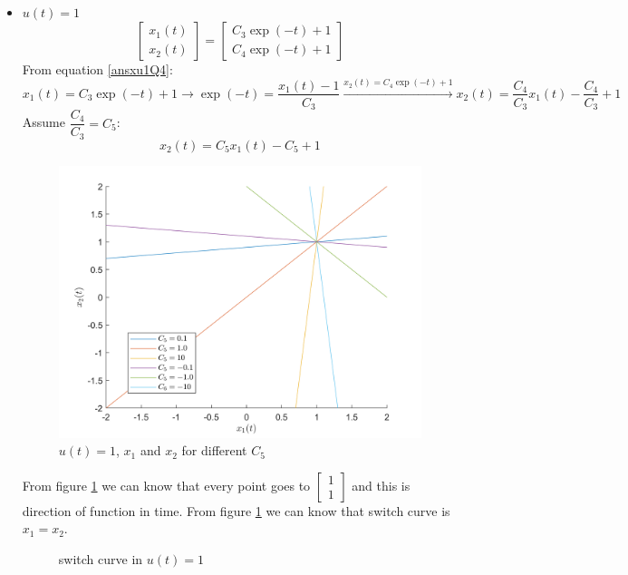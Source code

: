 \begin{itemize}
	\item $u(t) = 1$
	\begin{equation}\label{ansxu1Q4}
		\begin{bmatrix}
			x_1(t) \\
			x_2(t)
		\end{bmatrix}
		= 
		\begin{bmatrix}
			C_3\exp(-t) + 1 \\
			C_4\exp(-t) + 1
		\end{bmatrix}
	\end{equation}
From equation \ref{ansxu1Q4}:
$$x_1(t) = C_3\exp(-t) + 1 \to \exp(-t) = \dfrac{x_1(t)-1}{C_3}\xrightarrow{x_2(t)=C_4\exp(-t) + 1} x_2(t) = \dfrac{C_4}{C_3}x_1(t) -‌\dfrac{C_4}{C_3} +1$$
Assume $\dfrac{C_4}{C_3} = C_5$:
$$x_2(t) = C_5x_1(t)-C_5 +1$$
\begin{figure}[H]
	\caption{$u(t) = 1$, $x_1$ and $x_2$ for different $C_5$}\label{x1x2u1Q4}
	\centering
	\includegraphics[width=12cm]{../Code/Q4/figures/lowu1x1x2mod.png}
\end{figure}
From figure \ref{x1x2u1Q4} we can know that every point goes to $\begin{bmatrix}
	1\\1
\end{bmatrix}$ and this is direction of function in time. From figure \ref{x1x2u1Q4} we can know that switch curve is $x_1 = x_2$.
\begin{figure}[H]
	\caption{switch curve in $u(t) = 1$}\label{x1x2u1Q4SC}
	\centering

\end{figure}
\end{itemize}
